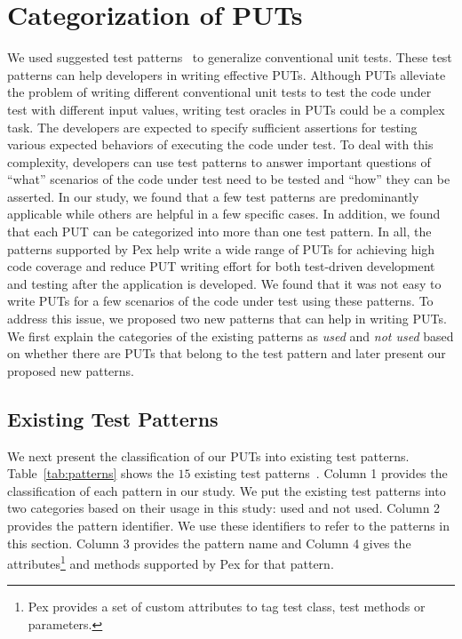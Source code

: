 \section{Categorization of PUTs}
\label{sec:categorization}

We used suggested test patterns~\cite{halleux08:putpatterns} 
to generalize conventional unit tests. These test patterns can help developers in writing effective PUTs. Although PUTs alleviate the problem of writing different conventional unit tests to test the code under test with different input values, writing test oracles in PUTs could be a complex task. The developers are expected to specify sufficient assertions for testing various expected behaviors of executing the code under test. To deal with this complexity, developers can use test patterns to answer important questions of ``what'' scenarios of the code under test need to be tested and ``how'' they can be asserted. In our study, we found that a few test patterns are predominantly applicable while others are helpful in a few specific cases. 
In addition, we found that each PUT can be categorized into more than
one test pattern. In all, the patterns supported by Pex help write a wide range of PUTs for achieving high code coverage and reduce
PUT writing effort for both test-driven development and testing after the application is developed. 
We found that it was not easy to write PUTs for a few scenarios of the code under test using these patterns. To address this issue, we proposed two new patterns that can help in writing PUTs. We first explain the categories of the existing patterns as \textit{used} and \textit{not used} based on whether there are PUTs that belong to the test pattern and later present our proposed new patterns.
\subsection{Existing Test Patterns}

We next present the classification of our PUTs into existing test patterns. Table~\ref{tab:patterns} shows the $15$ existing test patterns~\cite{halleux08:putpatterns}. Column 1 provides the classification of each pattern in our study. We put the existing test patterns into two categories based on their usage in this study: used and not used. Column 2 provides the pattern identifier. We use these identifiers to refer to the patterns in this section. Column 3 provides the pattern name and Column 4 gives the attributes\footnote{Pex provides a set of custom attributes to tag test class, test methods or parameters.} and methods supported by Pex for that pattern. 

